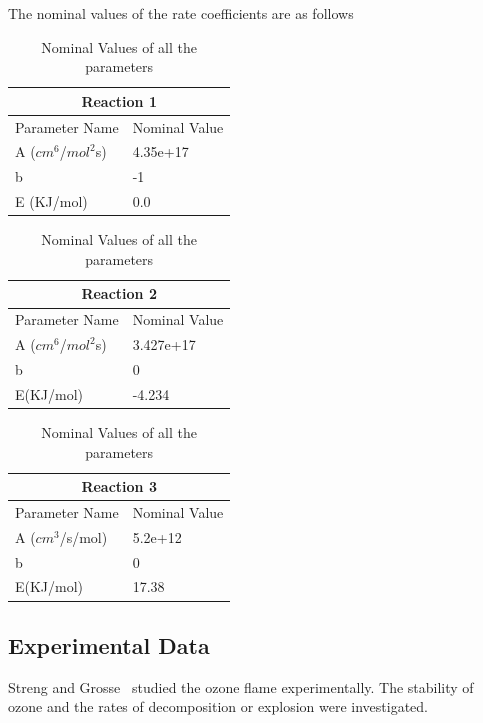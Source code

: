 The nominal values of the rate coefficients are as follows
\begin{table}[H]
\caption {Nominal Values of all the parameters} \label{tab:nominal-data}
\begin{center}

\begin{tabular}{ |p{3cm}|p{3cm}|}
 \hline
 \multicolumn{2}{|c|}{Reaction 1} \\
 \hline
 Parameter Name   & Nominal Value   \\
 \hline
    A ($cm^6$/$mol^2$s)    & 4.35e+17         \\
    b      & -1       \\
    E (KJ/mol)      & 0.0   \\
 \hline
\end{tabular}
 \newline
\vspace*{0.7 cm}
\newline
\begin{tabular}{ |p{3cm}|p{3cm}|}
 \hline
 \multicolumn{2}{|c|}{Reaction 2} \\
 \hline
 Parameter Name   & Nominal Value   \\
 \hline
    A ($cm^6$/$mol^2$s)     & 3.427e+17         \\
    b      & 0       \\
    E(KJ/mol)      & -4.234   \\
  \hline
\end{tabular}
  \newline
\vspace*{0.7 cm}
\newline
\begin{tabular}{ |p{3cm}|p{3cm}|}
\hline
\multicolumn{2}{|c|}{Reaction 3} \\
\hline
 Parameter Name   & Nominal Value   \\
\hline
    A ($cm^3$/s/mol)     & 5.2e+12         \\
    b      & 0       \\
    E(KJ/mol)      & 17.38   \\
 \hline
\end{tabular}
 \end{center}
\end{table}
\subsection{Experimental Data}

Streng and Grosse~\cite{Streng} studied the ozone
flame experimentally. The stability of ozone and the rates of
decomposition or explosion were investigated.%
 
